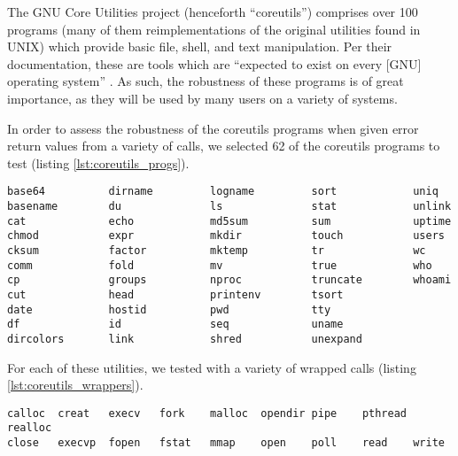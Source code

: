 The GNU Core Utilities project (henceforth ``coreutils'') comprises over 100 programs (many of them reimplementations of the original utilities found in UNIX) which provide basic file, shell, and text manipulation. Per their documentation, these are tools which are ``expected to exist on every [GNU] operating system'' \cite{coreutils}. As such, the robustness of these programs is of great importance, as they will be used by many users on a variety of systems.

In order to assess the robustness of the coreutils programs when given error return values from a variety of calls, we selected 62 of the coreutils programs to test (listing \ref{lst:coreutils_progs}).


\iffalse
cat ~/ReturnValueTester/test\_dir/utils.txt.bak | egrep -v '^#|^$' | cut -d "|" -f 1 | sort > utils_used.txt
ls -f -a -1 ~/Downloads/coreutils-8.25/src/*.c | rev | cut -d "/" -f 1 | rev | cut -d "." -f 1 | sort > coreutils.txt 
comm utils_used.txt coreutils.txt -12 | column -c 80
\fi

\begin{lstlisting}[label={lst:coreutils_progs},caption={GNU Core Utilities tested}]
base64          dirname         logname         sort            uniq
basename        du              ls              stat            unlink
cat             echo            md5sum          sum             uptime
chmod           expr            mkdir           touch           users
cksum           factor          mktemp          tr              wc
comm            fold            mv              true            who
cp              groups          nproc           truncate        whoami
cut             head            printenv        tsort
date            hostid          pwd             tty
df              id              seq             uname
dircolors       link            shred           unexpand
\end{lstlisting}

For each of these utilities, we tested with a variety of wrapped calls (listing \ref{lst:coreutils_wrappers}).

\begin{lstlisting}[label={lst:coreutils_wrappers},caption={Wrapped calls for testing GNU Core Utilities}]
calloc  creat   execv   fork    malloc  opendir pipe    pthread realloc
close   execvp  fopen   fstat   mmap    open    poll    read    write
\end{lstlisting}

